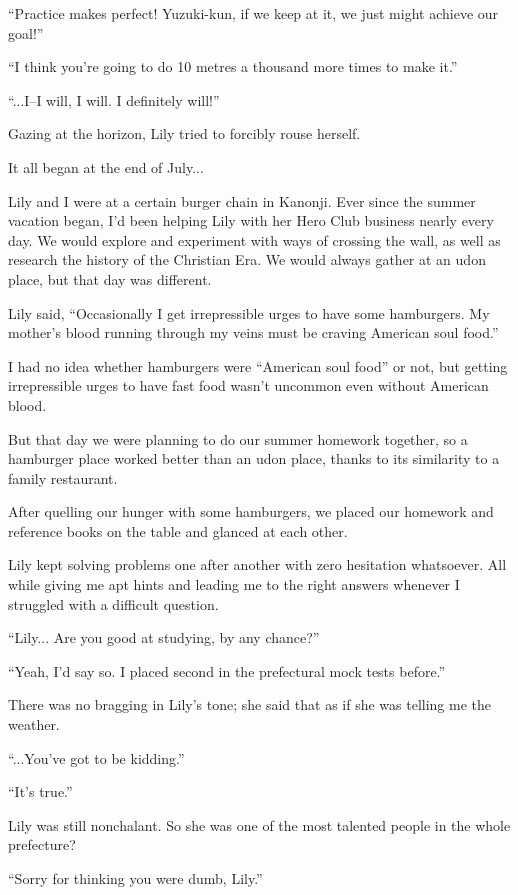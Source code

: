 ``Practice makes perfect! Yuzuki-kun, if we keep at it, we just might achieve our goal!''

``I think you're going to do 10 metres a thousand more times to make it.''

``...I--I will, I will. I definitely will!''

Gazing at the horizon, Lily tried to forcibly rouse herself.

It all began at the end of July...

Lily and I were at a certain burger chain in Kanonji. Ever since the summer vacation began, I'd been helping Lily with her Hero Club business nearly every day. We would explore and experiment with ways of crossing the wall, as well as research the history of the Christian Era. We would always gather at an udon place, but that day was different.

Lily said, ``Occasionally I get irrepressible urges to have some hamburgers. My mother's blood running through my veins must be craving American soul food.''

I had no idea whether hamburgers were ``American soul food'' or not, but getting irrepressible urges to have fast food wasn't uncommon even without American blood.

But that day we were planning to do our summer homework together, so a hamburger place worked better than an udon place, thanks to its similarity to a family restaurant.

After quelling our hunger with some hamburgers, we placed our homework and reference books on the table and glanced at each other.

Lily kept solving problems one after another with zero hesitation whatsoever. All while giving me apt hints and leading me to the right answers whenever I struggled with a difficult question.

``Lily... Are you good at studying, by any chance?''

``Yeah, I'd say so. I placed second in the prefectural mock tests before.''

There was no bragging in Lily's tone; she said that as if she was telling me the weather.

``...You've got to be kidding.''

``It's true.''

Lily was still nonchalant. So she was one of the most talented people in the whole prefecture?

``Sorry for thinking you were dumb, Lily.''

